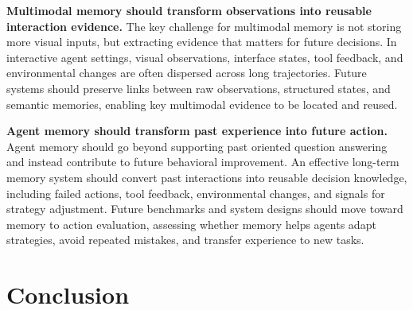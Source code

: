 \documentclass{article}
\begin{document}
\textbf{  Multimodal memory should transform observations into reusable interaction evidence.} 
The key challenge for multimodal memory is not storing more visual inputs, but extracting evidence that matters for future decisions. In interactive agent settings, visual observations, interface states, tool feedback, and environmental changes are often dispersed across long trajectories. Future systems should preserve links between raw observations, structured states, and semantic memories, enabling key multimodal evidence to be located and reused.

\textbf{  Agent memory should transform past experience into future action.} Agent memory should go beyond supporting past oriented question answering and instead contribute to future behavioral improvement. An effective long-term memory system should convert past interactions into reusable decision knowledge, including failed actions, tool feedback, environmental changes, and signals for strategy adjustment. Future benchmarks and system designs should move toward memory to action evaluation, assessing whether memory helps agents adapt strategies, avoid repeated mistakes, and transfer experience to new tasks.

\section{Conclusion}
\label{sec:conclusion}











\clearpage


\end{document}
